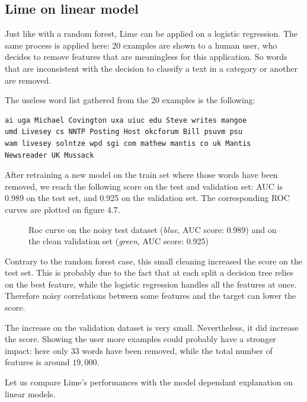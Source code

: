 \documentclass[a4paper,11pt]{kth-mag}
\begin{document}
\subsection{Lime on linear model}

Just like with a random forest, Lime can be applied on a logistic regression. The same process is applied here: 20 examples are shown to a human user, who decides to remove features that are meaningless for this application. So words that are inconsistent with the decision to classify a text in a category or another are removed.

The useless word list gathered from the 20 examples is the following: 

\begin{center}
\begin{verbatim}
ai uga Michael Covington uxa uiuc edu Steve writes mangoe 
umd Livesey cs NNTP Posting Host okcforum Bill psuvm psu 
wam livesey solntze wpd sgi com mathew mantis co uk Mantis
Newsreader UK Mussack
\end{verbatim}
\end{center}

After retraining a new model on the train set where those words have been removed, we reach the following score on the test and validation set: AUC is 0.989 on the test set, and 0.925 on the validation set. The corresponding ROC curves are plotted on figure 4.7.

\begin{figure}[h!]
		\centering
    	\def\svgwidth{\columnwidth}
    	\resizebox{0.6\textwidth}{!}{}
    	\caption{Roc curve on the noisy test dataset (\textit{blue}, AUC score: 0.989) and on the clean validation set (\textit{green}, AUC score: 0.925)}
\end{figure}

Contrary to the random forest case, this small cleaning increased the score on the test set. This is probably due to the fact that at each split a decision tree relies on the best feature, while the logistic regression handles all the features at once. Therefore noisy correlations between some features and the target can lower the score.

The increase on the validation dataset is very small. Nevertheless, it did increase the score. Showing the user more examples could probably have a stronger impact: here only 33 words have been removed, while the total number of features is around $19,000$.

Let us compare Lime's performances with the model dependant explanation on linear models.
\end{document}
